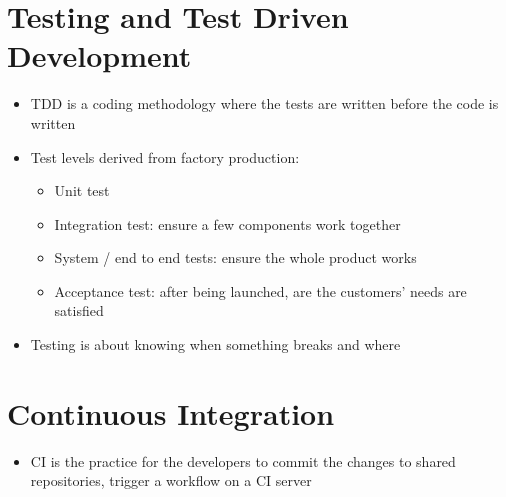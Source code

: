 \section{Testing and Test Driven Development}
\begin{itemize}
	\item \ac{TDD} is a coding methodology where the tests are written before the code is written
	\item Test levels derived from factory production:
	\begin{itemize}
		\item Unit test
		\item Integration test: ensure a few components work together
		\item System / end to end tests: ensure the whole product works
		\item Acceptance test: after being launched, are the customers' needs are satisfied
	\end{itemize}
	\item Testing is about knowing when something breaks and where
\end{itemize}

\section{Continuous Integration}
\begin{itemize}
	\item \ac{CI} is the practice for the developers to commit the changes to shared repositories, trigger a workflow on a CI server
\end{itemize}